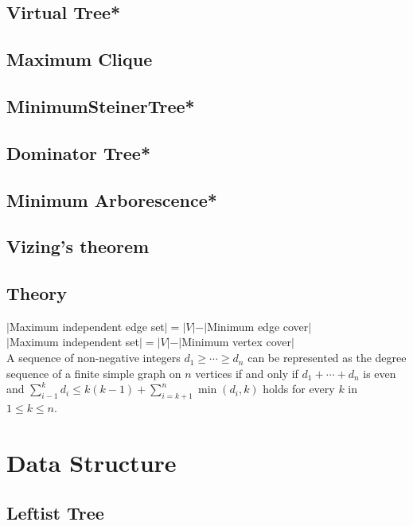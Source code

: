 \subsection{Virtual Tree*} %

\subsection{Maximum Clique}

\subsection{MinimumSteinerTree*} %

\subsection{Dominator Tree*} %

\subsection{Minimum Arborescence*} %

\subsection{Vizing's theorem}

\subsection{Theory}
\begin{footnotesize}
$|$Maximum independent edge set$|=|V|-|$Minimum edge cover$|$\\
$|$Maximum independent set$|=|V|-|$Minimum vertex cover$|$\\
A sequence of non-negative integers $d_1\ge\cdots\ge d_n$ can be represented as the degree sequence of a finite simple graph on $n$ vertices if and only if $d_1+\cdots+d_n$ is even and $\displaystyle\sum_{i-1}^kd_i\le k(k-1)+\displaystyle\sum_{i=k+1}^n\min(d_i,k)$ holds for every $k$ in $1\le k\le n$.
\end{footnotesize}


\section{Data Structure}
\subsection{Leftist Tree}

